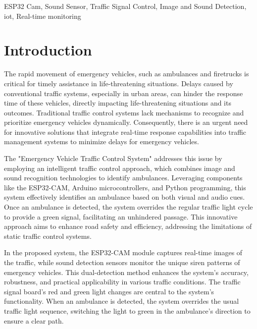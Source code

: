 \documentclass[conference]{IEEEtran}
\begin{document}
\begin{IEEEkeywords}
ESP32 Cam, Sound Sensor, Traffic Signal Control, Image and Sound Detection, iot, Real-time monitoring
\end{IEEEkeywords}



\section{Introduction}
The rapid movement of emergency vehicles, such as ambulances and firetrucks is critical for timely assistance in life-threatening situations. Delays caused by conventional traffic systems, especially in urban areas, can hinder the response time of these vehicles, directly impacting life-threatening situations and its outcomes. Traditional traffic control systems lack mechanisms to recognize and prioritize emergency vehicles dynamically. Consequently, there is an urgent need for innovative solutions that integrate real-time response capabilities into traffic management systems to minimize delays for emergency vehicles.

The "Emergency Vehicle Traffic Control System" addresses this issue by employing an intelligent traffic control approach, which combines image and sound recognition technologies to identify ambulances. Leveraging components like the ESP32-CAM, Arduino microcontrollers, and Python programming, this system effectively identifies an ambulance based on both visual and audio cues. Once an ambulance is detected, the system overrides the regular traffic light cycle to provide a green signal, facilitating an unhindered passage. This innovative approach aims to enhance road safety and efficiency, addressing the limitations of static traffic control systems.

In the proposed system, the ESP32-CAM module captures real-time images of the traffic, while sound detection sensors monitor the unique siren patterns of emergency vehicles. This dual-detection method enhances the system's accuracy, robustness, and practical applicability in various traffic conditions. The traffic signal board's red and green light changes are central to the system's functionality. When an ambulance is detected, the system overrides the usual traffic light sequence, switching the light to green in the ambulance’s direction to ensure a clear path.
\end{document}
